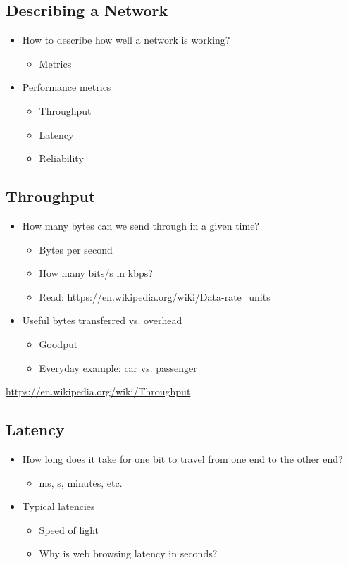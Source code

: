\subsection{Describing a Network}
\begin{itemize}[nosep]
    \item How to describe how well a network is working?
          \begin{itemize}[nosep]
              \item Metrics
          \end{itemize}
    \item Performance metrics
          \begin{itemize}[nosep]
              \item Throughput
              \item Latency
              \item Reliability
          \end{itemize}
\end{itemize}
\subsection{Throughput}
\begin{itemize}[nosep]
    \item How many bytes can we send through in a given time?
          \begin{itemize}[nosep]
              \item Bytes per second
              \item How many bits/s in kbps?
              \item Read: \url{https://en.wikipedia.org/wiki/Data-rate_units}
          \end{itemize}
    \item Useful bytes transferred vs. overhead
          \begin{itemize}[nosep]
              \item Goodput
              \item Everyday example: car vs. passenger
          \end{itemize}
\end{itemize}
\url{https://en.wikipedia.org/wiki/Throughput}
\subsection{Latency}
\begin{itemize}[nosep]
    \item How long does it take for one bit to travel from one end to the other end?
          \begin{itemize}[nosep]
              \item ms, s, minutes, etc.
          \end{itemize}
    \item Typical latencies
          \begin{itemize}[nosep]
              \item Speed of light
              \item Why is web browsing latency in seconds?
          \end{itemize}
\end{itemize}

